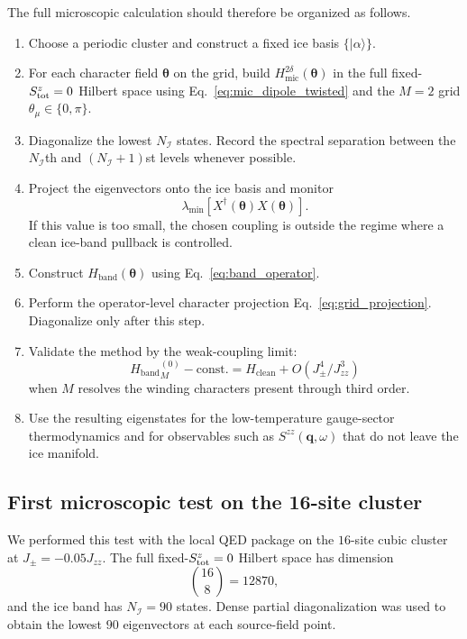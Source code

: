 \documentclass[11pt,letterpaper]{article}
\newcommand{\Jzz}{J_{zz}}
\newcommand{\Jpm}{J_{\pm}}
\newcommand{\Hclean}{H_{\mathrm{clean}}}
\newcommand{\bq}{\bm q}
\newcommand{\btheta}{\bm \theta}
\newcommand{\ice}{\mathcal I}
\newcommand{\HB}{H_{\mathrm{band}}}
\newcommand{\Hmic}{H_{\mathrm{mic}}}
\theoremstyle{plain}
\theoremstyle{definition}
\begin{document}
The full microscopic calculation should therefore be organized as follows.
\begin{enumerate}
\item Choose a periodic cluster and construct a fixed ice basis
$\{|\alpha\rangle\}$.
\item For each character field $\btheta$ on the grid, build
$\Hmic^{2\delta}(\btheta)$ in the full fixed-$S^z_{\rm tot}=0$ Hilbert space
using Eq.~\eqref{eq:mic_dipole_twisted} and the $M=2$ grid
$\theta_\mu\in\{0,\pi\}$.
\item Diagonalize the lowest $N_{\ice}$ states.  Record the spectral
separation between the $N_{\ice}$th and $(N_{\ice}+1)$st levels whenever
possible.
\item Project the eigenvectors onto the ice basis and monitor
\[
\lambda_{\min}\!\left[X^\dagger(\btheta)X(\btheta)\right].
\]
If this value is too small, the chosen coupling is outside the regime where a
clean ice-band pullback is controlled.
\item Construct $\HB(\btheta)$ using Eq.~\eqref{eq:band_operator}.
\item Perform the operator-level character projection
Eq.~\eqref{eq:grid_projection}.  Diagonalize only after this step.
\item Validate the method by the weak-coupling limit:
\[
{\HB}^{(0)}_M-\text{const.}
=\Hclean+O(\Jpm^4/\Jzz^3)
\]
when $M$ resolves the winding characters present through third order.
\item Use the resulting eigenstates for the low-temperature gauge-sector
thermodynamics and for observables such as $S^{zz}(\bq,\omega)$ that do not
leave the ice manifold.
\end{enumerate}

\subsection{First microscopic test on the 16-site cluster}

We performed this test with the local QED package on the $16$-site cubic
cluster at $\Jpm=-0.05\Jzz$.  The full fixed-$S^z_{\rm tot}=0$ Hilbert space
has dimension
\[
\binom{16}{8}=12870,
\]
and the ice band has $N_{\ice}=90$ states.  Dense partial diagonalization was
used to obtain the lowest $90$ eigenvectors at each source-field point.
\end{document}
